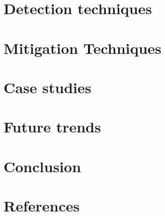 \documentclass{article}
\begin{document}
\section{Detection techniques}%

\section{Mitigation Techniques}%


\section{Case studies}%


\section{Future trends}%


\section{Conclusion}%


\section{References}%
\end{document}
